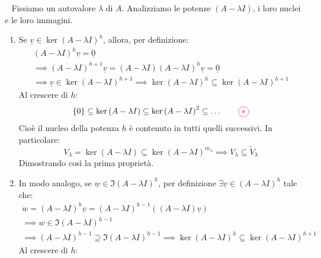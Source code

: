 \begin{demonstration}~{}
	Fissiamo un autovalore $\lambda$ di $A$. Analizziamo le potenze $\left(A-\lambda I\right)$, i loro nuclei e le loro immagini.
\begin{enumerate}[label=\Roman*]
	\item Se $\underline{v}\in \ker \left(A-\lambda I\right)^h$, allora, per definizione:
	\begin{equation*}
		\begin{array}{l}
					\left(A-\lambda I\right)^h\underline{v}=\underline{0}\\
			\implies\left(A-\lambda I\right)^{h+1}\underline{v}=\left(A-\lambda I\right)\left(A-\lambda I\right)^h\underline{v}=\underline{0}\\
			\implies \underline{v}\in \ker \left(A-\lambda I\right)^{h+1}
			\implies \ker \left(A-\lambda I\right)^h\subseteq \ker \left(A-\lambda I\right)^{h+1}
		\end{array}
	\end{equation*}
Al crescere di $h$:
\begin{equation}
\left\{0\right\}\subseteq \ker \left(A-\lambda I\right)\subseteq\ker \left(A-\lambda I\right)^2\subseteq\ldots \qquad\textcolor{red}{\circled{\ast}} 
\end{equation}
Cioè il nucleo della potenza $h$ è contenuto in tutti quelli successivi. In particolare:
\begin{equation*}
V_{\lambda}=\ker\left(A-\lambda I\right)\subseteq \ker\left(A-\lambda I\right)^{m_{\lambda}}\implies V_{\lambda}\subseteq \tilde{V}_{\lambda}
\end{equation*}
Dimostrando così la prima proprietà.
\item In modo analogo, se $\underline{w}\in\Im \left(A-\lambda I\right)^h$, per definizione $\exists\underline{v}\in\left(A-\lambda I\right)^h$ tale che:
	\begin{equation*}
	\begin{array}{l}
		w=\left(A-\lambda I\right)^h\underline{v}=\left(A-\lambda I\right)^{h-1}\left(\left(A-\lambda I\right)\underline{v}\right)\\
		\implies w\in\Im\left(A-\lambda I\right)^{h-1}\\
		\implies \left(A-\lambda I\right)^{h-1}\supseteq\Im\left(A-\lambda I\right)^{h-1}
		\implies \ker \left(A-\lambda I\right)^h\subseteq \ker \left(A-\lambda I\right)^{h+1}
	\end{array}
\end{equation*}
Al crescere di $h$:
\begin{equation}

\end{equation}
\end{enumerate}
\end{demonstration}
